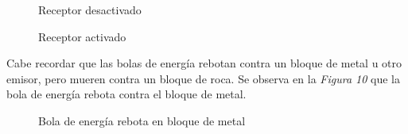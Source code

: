 \documentclass[a4paper]{article}
\begin{document}
\begin{figure}[!h]
	\caption{Receptor desactivado}
	\label{fig:diagrama9}
\end{figure}

\begin{figure}[!h]
	\caption{Receptor activado}
	\label{fig:diagrama10}
\end{figure}

\newpage

Cabe recordar que las bolas de energía rebotan contra un bloque de metal u otro emisor, pero mueren contra un bloque de roca. Se observa en la \textit{Figura 10} que la bola de energía rebota contra el bloque de metal.

\begin{figure}[!h]
	\caption{Bola de energía rebota en bloque de metal}
	\label{fig:diagrama11}
\end{figure}
\end{document}

